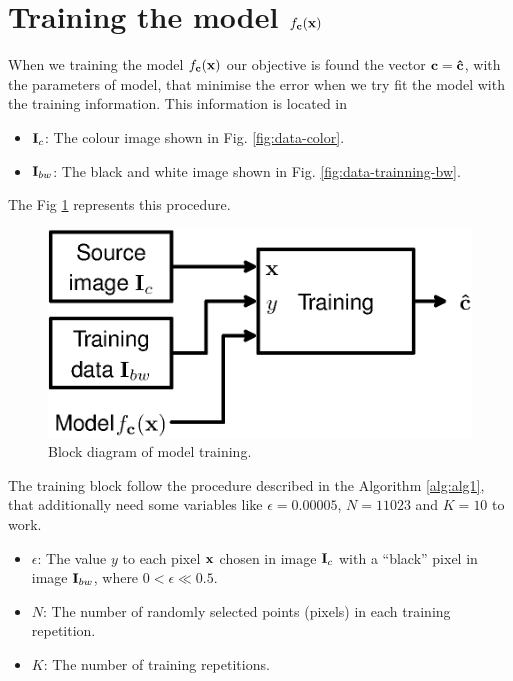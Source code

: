 \section{Training the model $f_{\VECTOR{c}}(\VECTOR{x})$}

When we training the model $f_{\VECTOR{c}}(\VECTOR{x})$
our objective is found the vector $\VECTOR{c}=\VECTOR{\hat{c}}$, with the parameters of model, 
that minimise the error when we try fit the model with the training information.
This information is located in 
\begin{itemize}
\item $\MATRIX{I}_c$: The colour image shown in Fig. \ref{fig:data-color}.
\item $\MATRIX{I}_{bw}$: The black and white image shown in Fig. \ref{fig:data-trainning-bw}.
\end{itemize}
The Fig \ref{fig:training} represents this procedure.

\begin{figure}[h!]
\centering
\includegraphics[width=0.99\linewidth]{training.eps}
\caption{Block diagram of model training.}
\label{fig:training}
\end{figure} 

The training block follow the procedure described in the 
Algorithm \ref{alg:alg1}, that additionally need some variables like $\epsilon=0.00005$, $N=11023$ and $K=10$ to work.
\begin{itemize}
\item $\epsilon$: The value $y$ to each pixel $\VECTOR{x}$ chosen in image $\MATRIX{I}_{c}$
with a ``black'' pixel in image $\MATRIX{I}_{bw}$, where $0 < \epsilon \ll 0.5$.
\item $N$: The number of randomly selected points (pixels) 
in each training repetition.
\item $K$: The number of training repetitions.
\end{itemize}

